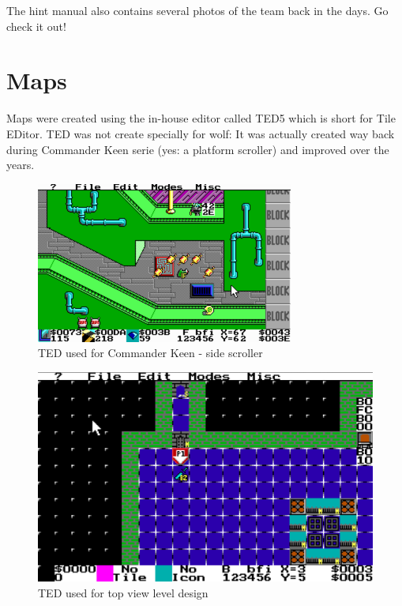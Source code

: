 \documentclass[book.tex]{subfiles}
\begin{document}
\par 
The hint manual also contains several photos of the team back in the days. Go check it out!













\section{Maps}
Maps were created using the in-house editor called TED5 which is short for Tile EDitor. TED was not create specially for wolf: It was actually created way back during Commander Keen serie (yes: a platform scroller) and improved over the years.\\

 \begin{figure}[H]
\centering
 \includegraphics[width=\textwidth]{screenshots/ted5_scrolling_map.png}
 \caption{TED used for Commander Keen - side scroller} 
 \end{figure}


\begin{figure}[H]
\centering
 \includegraphics[width=\textwidth]{screenshots/TED.png}
 \caption{TED used for top view level design} 
 \end{figure}
\end{document}
